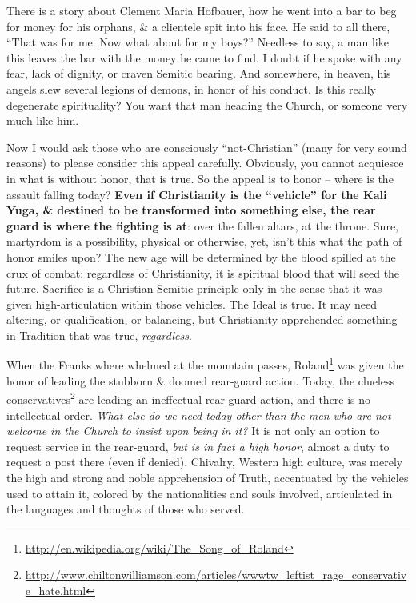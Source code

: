 There is a story about Clement Maria Hofbauer, how he went into a bar to beg for money for his orphans, \& a clientele spit into his face. He said to all there, ``That was for me. Now what about for my boys?'' Needless to say, a man like this leaves the bar with the money he came to find. I doubt if he spoke with any fear, lack of dignity, or craven Semitic bearing. And somewhere, in heaven, his angels slew several legions of demons, in honor of his conduct. Is this really degenerate spirituality? You want that man heading the Church, or someone very much like him.

Now I would ask those who are consciously ``not-Christian'' (many for very sound reasons) to please consider this appeal carefully. Obviously, you cannot acquiesce in what is without honor, that is true. So the appeal is to honor -- where is the assault falling today? \textbf{Even if Christianity is the ``vehicle'' for the Kali Yuga, \& destined to be transformed into something else, the rear guard is where the fighting is at}: over the fallen altars, at the throne. Sure, martyrdom is a possibility, physical or otherwise, yet, isn't this what the path of honor smiles upon? The new age will be determined by the blood spilled at the crux of combat: regardless of Christianity, it is spiritual blood that will seed the future. Sacrifice is a Christian-Semitic principle only in the sense that it was given high-articulation within those vehicles. The Ideal is true. It may need altering, or qualification, or balancing, but Christianity apprehended something in Tradition that was true, \emph{regardless}.

When the Franks where whelmed at the mountain passes, Roland\footnote{\url{http://en.wikipedia.org/wiki/The\_Song\_of\_Roland}} was given the honor of leading the stubborn \& doomed rear-guard action. Today, the clueless conservatives\footnote{\url{http://www.chiltonwilliamson.com/articles/wwwtw\_leftist\_rage\_conservative\_hate.html}} are leading an ineffectual rear-guard action, and there is no intellectual order. \emph{What else do we need today other than the men who are not welcome in the Church to insist upon being in it?} It is not only an option to request service in the rear-guard, \emph{but is in fact a high honor}, almost a duty to request a post there (even if denied). Chivalry, Western high culture, was merely the high and strong and noble apprehension of Truth, accentuated by the vehicles used to attain it, colored by the nationalities and souls involved, articulated in the languages and thoughts of those who served.

